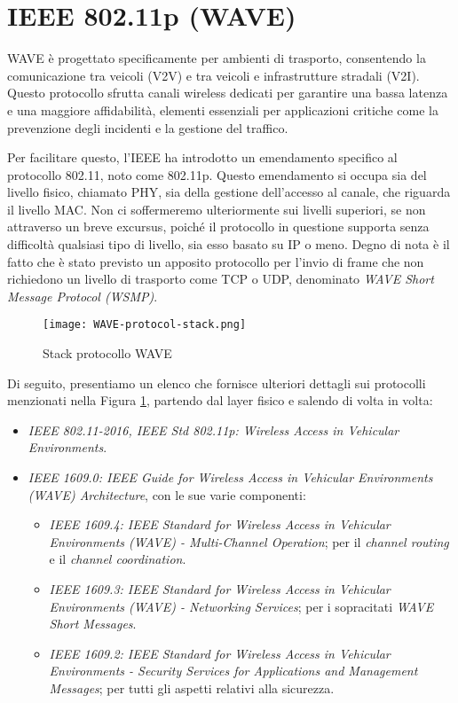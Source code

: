 \section{IEEE 802.11p (WAVE)}
WAVE è progettato specificamente per ambienti di trasporto, consentendo la comunicazione tra veicoli (V2V) e tra veicoli e infrastrutture stradali (V2I). Questo protocollo sfrutta canali wireless dedicati per garantire una bassa latenza e una maggiore affidabilità, elementi essenziali per applicazioni critiche come la prevenzione degli incidenti e la gestione del traffico. 

Per facilitare questo, l'IEEE ha introdotto un emendamento specifico al protocollo 802.11, noto come 802.11p\cite{std2007wireless}. Questo emendamento si occupa sia del livello fisico, chiamato PHY, sia della gestione dell'accesso al canale, che riguarda il livello MAC. Non ci soffermeremo ulteriormente sui livelli superiori, se non attraverso un breve excursus, poiché il protocollo in questione supporta senza difficoltà qualsiasi tipo di livello, sia esso basato su IP o meno\cite{DSRC-Based-vehicular}. Degno di nota è il fatto che è stato previsto un apposito protocollo per l'invio di frame che non richiedono un livello di trasporto come TCP o UDP, denominato \textit{WAVE Short Message Protocol (WSMP)}.

\begin{figure}[h!]
    \centering
    \texttt{[image: WAVE-protocol-stack.png]}
    \caption{Stack protocollo WAVE}
    \label{fig:wave_stack}
\end{figure}

Di seguito, presentiamo un elenco che fornisce ulteriori dettagli sui protocolli menzionati nella Figura \ref{fig:wave_stack}, partendo dal layer fisico e salendo di volta in volta:

\begin{itemize}
    \item \textit{IEEE 802.11-2016, IEEE Std 802.11p: Wireless Access in Vehicular Environments}.
    \item \textit{IEEE 1609.0: IEEE Guide for Wireless Access in Vehicular Environments (WAVE) Architecture}\cite{8686445}, con le sue varie componenti: 
        \begin{itemize}
            \item \textit{IEEE 1609.4: IEEE Standard for Wireless Access in Vehicular Environments (WAVE) - Multi-Channel Operation}\cite{7435228}; per il \textit{channel routing} e il \textit{channel coordination}.
            \item \textit{IEEE 1609.3: IEEE Standard for Wireless Access in Vehicular Environments (WAVE) - Networking Services}\cite{9374154}; per i sopracitati \textit{WAVE Short Messages}.
            \item \textit{IEEE 1609.2: IEEE Standard for Wireless Access in Vehicular Environments - Security Services for Applications and Management Messages}\cite{10075082}; per tutti gli aspetti relativi alla sicurezza.
        \end{itemize}
\end{itemize}

